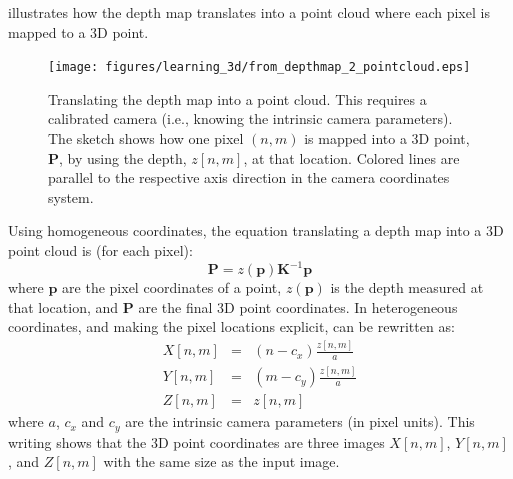 
\Fig{\ref{fig:kinect2}} illustrates how the depth map translates into a point cloud where each pixel is mapped to a 3D point.



\begin{figure}[t]
    \centerline{
        \texttt{[image: figures/learning\_3d/from\_depthmap\_2\_pointcloud.eps]}
    }
    \caption{Translating the depth map into a point cloud. This requires a calibrated camera (i.e., knowing the intrinsic camera parameters). The sketch shows how one pixel $(n,m)$ is mapped into a 3D point, $\mathbf{P}$, by using the depth, $z[n,m]$, at that location. Colored lines are parallel to the respective axis direction in the camera coordinates system.}
    \label{fig:kinect2}
\end{figure}

Using homogeneous coordinates, the equation translating a depth map into a 3D point cloud is (for each pixel):
\begin{equation}
    \mathbf{P} = z(\mathbf{p}) \mathbf{K}^{-1} \mathbf{p}
    \label{eq:3dcloudpointfromz}
\end{equation}
where $\mathbf{p}$ are the pixel coordinates of a point, $z(\mathbf{p})$ is the depth measured at that location, and $\mathbf{P}$ are the final 3D point coordinates.
In heterogeneous coordinates, and making the pixel locations explicit, \eqn{\ref{eq:3dcloudpointfromz}} can be rewritten as:
\begin{eqnarray}
    X[n,m] &=& \left( n-c_x \right) \frac{z[n,m]}{a} \nonumber \\
    Y[n,m] &=& \left( m-c_y \right) \frac{z[n,m]}{a} \nonumber \\
    Z[n,m] &=& z[n,m]
\end{eqnarray}
where $a$, $c_x$ and $c_y$ are the intrinsic camera parameters (in pixel units). This writing shows that the 3D point coordinates are three images $X[n,m]$, $Y[n,m]$, and $Z[n,m]$ with the same size as the input image.

